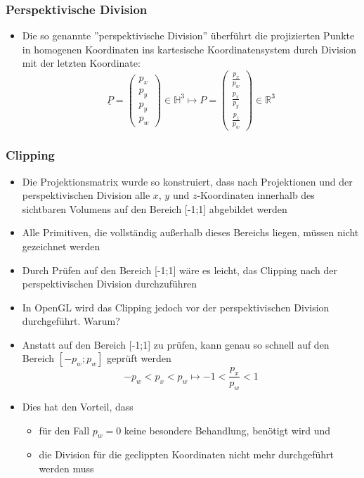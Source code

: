 \documentclass{scrartcl}
\begin{document}
\subsubsection{Perspektivische Division}

\begin{itemize}
	\item Die so genannte ''perspektivische Division'' überführt die projizierten Punkte in homogenen Koordinaten ins kartesische Koordinatensystem durch Division mit der letzten Koordinate:
	\begin{equation}
		\underline{P} = \begin{pmatrix}
		p_x \\
		p_y \\
		p_y \\
		p_w
		\end{pmatrix} \in \mathbb{H}^3 \mapsto P = \begin{pmatrix}
		\frac{p_x}{p_w} \\
		\frac{p_x}{p_y} \\
		\frac{p_z}{p_w}
		\end{pmatrix} \in \mathbb{R}^3
	\end{equation}
\end{itemize}

\subsubsection{Clipping}

\begin{itemize}
	\item Die Projektionsmatrix wurde so konstruiert, dass nach Projektionen und der perspektivischen Division alle $x$, $y$ und $z$-Koordinaten innerhalb des sichtbaren Volumens auf den Bereich [-1;1] abgebildet werden
	\item Alle Primitiven, die vollständig außerhalb dieses Bereichs liegen, müssen nicht gezeichnet werden
	\item Durch Prüfen auf den Bereich [-1;1] wäre es leicht, das Clipping nach der perspektivischen Division durchzuführen
	\item In OpenGL wird das Clipping jedoch vor der perspektivischen Division durchgeführt. Warum?
	\item Anstatt auf den Bereich [-1;1] zu prüfen, kann genau so schnell auf den Bereich $[-p_w;p_w]$ geprüft werden
	\begin{equation}
		-p_w < p_x < p_w \mapsto -1 < \frac{p_x}{p_w} < 1
	\end{equation}
	\item Dies hat den Vorteil, dass
	\begin{itemize}
		\item für den Fall $p_w = 0$ keine besondere Behandlung, benötigt wird und
		\item die Division für die geclippten Koordinaten nicht mehr durchgeführt werden muss
	\end{itemize}
\end{itemize}
\end{document}

